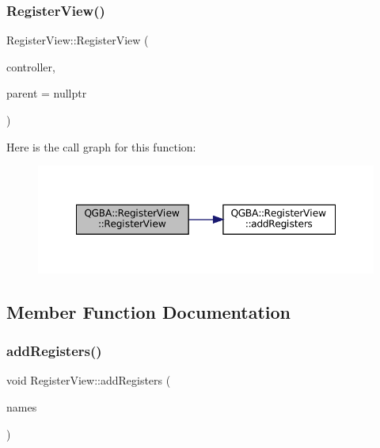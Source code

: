 \subsubsection{\texorpdfstring{Register\+View()}{RegisterView()}}
{\footnotesize\ttfamily Register\+View\+::\+Register\+View (\begin{DoxyParamCaption}\item[{std\+::shared\+\_\+ptr$<$ \mbox{\hyperlink{class_q_g_b_a_1_1_core_controller}{Core\+Controller}} $>$}]{controller,  }\item[{Q\+Widget $\ast$}]{parent = {\ttfamily nullptr} }\end{DoxyParamCaption})}

Here is the call graph for this function\+:
\nopagebreak
\begin{figure}[H]
\begin{center}
\leavevmode
\includegraphics[width=348pt]{class_q_g_b_a_1_1_register_view_a34ed2c1fb824ee2e61c6c57e85dc4d7d_cgraph}
\end{center}
\end{figure}


\subsection{Member Function Documentation}
\mbox{\label{class_q_g_b_a_1_1_register_view_a221b8e5f09c2741bd56daf14786bf284}} 
\subsubsection{\texorpdfstring{add\+Registers()}{addRegisters()}}
{\footnotesize\ttfamily void Register\+View\+::add\+Registers (\begin{DoxyParamCaption}\item[{const Q\+String\+List \&}]{names }\end{DoxyParamCaption})\hspace{0.3cm}{\ttfamily [private]}}

